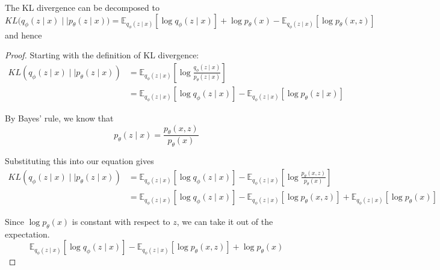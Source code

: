   \begin{theorem}
    The KL divergence can be decomposed to 
    \begin{equation}
      KL \big( q_\phi (z \mid x) \mid\mid p_{\theta} (z \mid x) \big) = \mathbb{E}_{q_\phi(z \mid x)} [ \log q_{\phi} (z \mid x)] + \log p_{\theta} (x) - \mathbb{E}_{q_{\phi} (z \mid x)} [\log p_{\theta} (x, z)]
    \end{equation}
    and hence 
  \end{theorem}
  \begin{proof}
    Starting with the definition of KL divergence:
    \begin{align}
      KL(q_\phi(z \mid x) \mid\mid p_\theta(z \mid x)) &= \mathbb{E}_{q_\phi(z \mid x)}\left[\log \frac{q_\phi(z \mid x)}{p_\theta(z \mid x)}\right] \\
      &= \mathbb{E}_{q_\phi(z \mid x)}[\log q_\phi(z \mid x)] - \mathbb{E}_{q_\phi(z \mid x)}[\log p_\theta(z \mid x)]
    \end{align}

    By Bayes' rule, we know that
    \begin{equation}
      p_\theta(z \mid x) = \frac{p_\theta(x, z)}{p_\theta(x)}
    \end{equation}

    Substituting this into our equation gives 
    \begin{align}
      KL(q_\phi(z \mid x) \mid\mid p_\theta(z \mid x)) &= \mathbb{E}_{q_\phi(z \mid x)}[\log q_\phi(z \mid x)] - \mathbb{E}_{q_\phi(z \mid x)}\left[\log \frac{p_\theta(x, z)}{p_\theta(x)}\right] \\
      &= \mathbb{E}_{q_\phi(z \mid x)}[\log q_\phi(z \mid x)] - \mathbb{E}_{q_\phi(z \mid x)}[\log p_\theta(x, z)] + \mathbb{E}_{q_\phi(z \mid x)}[\log p_\theta(x)]
    \end{align}

    Since $\log p_\theta(x)$ is constant with respect to $z$, we can take it out of the expectation. 
    \begin{equation}
      \mathbb{E}_{q_\phi(z \mid x)}[\log q_\phi(z \mid x)] - \mathbb{E}_{q_\phi(z \mid x)}[\log p_\theta(x, z)] + \log p_\theta(x)
    \end{equation}
  \end{proof}

